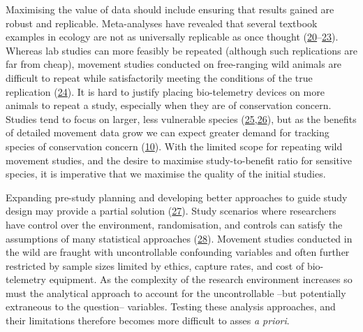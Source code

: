 \documentclass[10pt,a4paper]{article}
\begin{document}
Maximising the value of data should include ensuring that results gained are robust and replicable.
Meta-analyses have revealed that several textbook examples in ecology are not as universally replicable as once thought (\protect\hyperlink{ref-clark_ocean_2020}{20}--\protect\hyperlink{ref-wang_irreproducible_2018}{23}).
Whereas lab studies can more feasibly be repeated (although such replications are far from cheap), movement studies conducted on free-ranging wild animals are difficult to repeat while satisfactorily meeting the conditions of the true replication (\protect\hyperlink{ref-fraser_role_2020}{24}).
It is hard to justify placing bio-telemetry devices on more animals to repeat a study, especially when they are of conservation concern.
Studies tend to focus on larger, less vulnerable species (\protect\hyperlink{ref-crane_lots_2021}{25},\protect\hyperlink{ref-tam_quantifying_2021}{26}), but as the benefits of detailed movement data grow we can expect greater demand for tracking species of conservation concern (\protect\hyperlink{ref-Fraser2018}{10}).
With the limited scope for repeating wild movement studies, and the desire to maximise study-to-benefit ratio for sensitive species, it is imperative that we maximise the quality of the initial studies.

Expanding pre-study planning and developing better approaches to guide study design may provide a partial solution (\protect\hyperlink{ref-williams_optimizing_2020}{27}).
Study scenarios where researchers have control over the environment, randomisation, and controls can satisfy the assumptions of many statistical approaches (\protect\hyperlink{ref-christie_simple_2019}{28}).
Movement studies conducted in the wild are fraught with uncontrollable confounding variables and often further restricted by sample sizes limited by ethics, capture rates, and cost of bio-telemetry equipment.
As the complexity of the research environment increases so must the analytical approach to account for the uncontrollable --but potentially extraneous to the question-- variables.
Testing these analysis approaches, and their limitations therefore becomes more difficult to asses \emph{a priori}.
\end{document}
